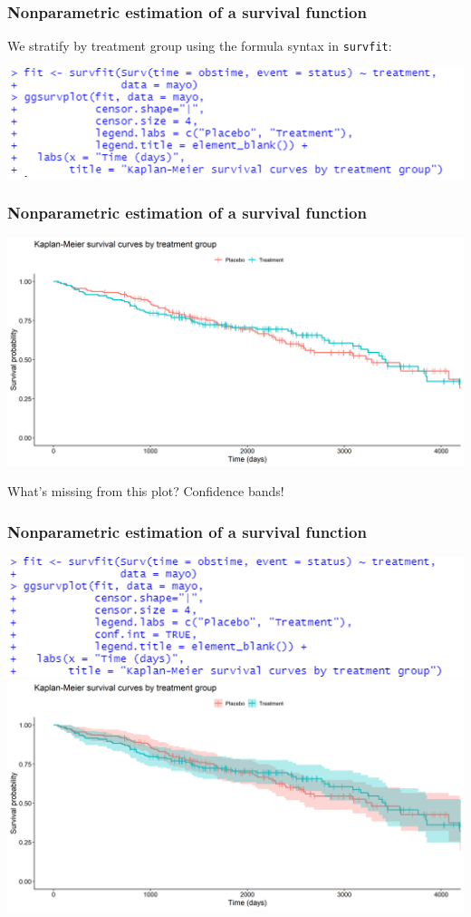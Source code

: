 \documentclass[10pt,t]{beamer}
\begin{document}
\begin{frame}
	\frametitle{Nonparametric estimation of a survival function} 
	We stratify by treatment group using the formula syntax in \texttt{survfit}:
	\begin{center}
		\includegraphics[width=\textwidth]{figs/KM_strat_code.png}
	\end{center}
\end{frame}

\begin{frame}
	\frametitle{Nonparametric estimation of a survival function} 
	\begin{center}
		\includegraphics[width=\textwidth]{figs/KM_strat.png}
	\end{center}
	What's missing from this plot? \pause Confidence bands!
\end{frame}

\begin{frame}
	\frametitle{Nonparametric estimation of a survival function} 
	\begin{center}
			\includegraphics[height=0.3\textheight]{figs/KM_strat_CI_code.png}
		\includegraphics[width=\textwidth]{figs/KM_strat_CI.png}
	\end{center}
\end{frame}
\end{document}
